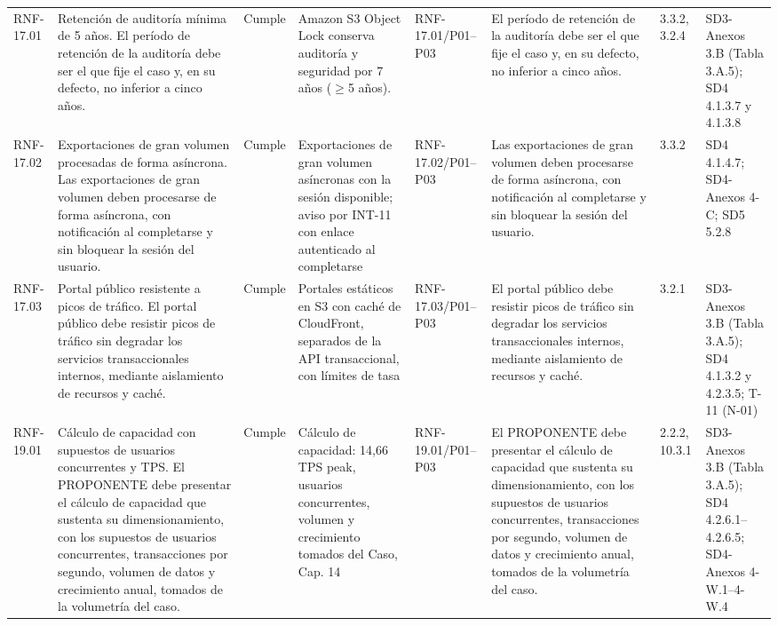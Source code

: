 \documentclass[oficio,firma,final]{lafrox}
\begin{document}
\begin{landscape}
{\begin{longtable}{@{}F{0.054} F{0.173} F{0.061} F{0.191} F{0.106} F{0.180} F{0.067} F{0.168}@{}}
  RNF-17.01 & Retención de auditoría mínima de 5 años. El período de retención de la auditoría debe ser el que fije el caso y, en su defecto, no inferior a cinco años. & Cumple & Amazon S3 Object Lock conserva auditoría y seguridad por 7 años ($\geq$5 años). & RNF-17.01/\allowbreak{}P01--\allowbreak{}P03 & El período de retención de la auditoría debe ser el que fije el caso y, en su defecto, no inferior a cinco años. & 3.3.2, 3.2.4 & SD3-Anexos 3.B (Tabla 3.A.5); SD4 4.1.3.7 y 4.1.3.8  \\
  RNF-17.02 & Exportaciones de gran volumen procesadas de forma asíncrona. Las exportaciones de gran volumen deben procesarse de forma asíncrona, con notificación al completarse y sin bloquear la sesión del usuario. & Cumple & Exportaciones de gran volumen asíncronas con la sesión disponible; aviso por INT-11 con enlace autenticado al completarse & RNF-17.02/\allowbreak{}P01--\allowbreak{}P03 & Las exportaciones de gran volumen deben procesarse de forma asíncrona, con notificación al completarse y sin bloquear la sesión del usuario. & 3.3.2 & SD4 4.1.4.7; SD4-Anexos 4-C; SD5 5.2.8  \\
  RNF-17.03 & Portal público resistente a picos de tráfico. El portal público debe resistir picos de tráfico sin degradar los servicios transaccionales internos, mediante aislamiento de recursos y caché. & Cumple & Portales estáticos en S3 con caché de CloudFront, separados de la API transaccional, con límites de tasa & RNF-17.03/\allowbreak{}P01--\allowbreak{}P03 & El portal público debe resistir picos de tráfico sin degradar los servicios transaccionales internos, mediante aislamiento de recursos y caché. & 3.2.1 & SD3-Anexos 3.B (Tabla 3.A.5); SD4 4.1.3.2 y 4.2.3.5; T-11 (N-01)  \\
  RNF-19.01 & Cálculo de capacidad con supuestos de usuarios concurrentes y TPS. El PROPONENTE debe presentar el cálculo de capacidad que sustenta su dimensionamiento, con los supuestos de usuarios concurrentes, transacciones por segundo, volumen de datos y crecimiento anual, tomados de la volumetría del caso. & Cumple & Cálculo de capacidad: 14,66 TPS peak, usuarios concurrentes, volumen y crecimiento tomados del Caso, Cap. 14 & RNF-19.01/\allowbreak{}P01--\allowbreak{}P03 & El PROPONENTE debe presentar el cálculo de capacidad que sustenta su dimensionamiento, con los supuestos de usuarios concurrentes, transacciones por segundo, volumen de datos y crecimiento anual, tomados de la volumetría del caso. & 2.2.2, 10.3.1 & SD3-Anexos 3.B (Tabla 3.A.5); SD4 4.2.6.1–4.2.6.5; SD4-Anexos 4-W.1–4-W.4  \\

\end{longtable}}
\end{landscape}
\end{document}
